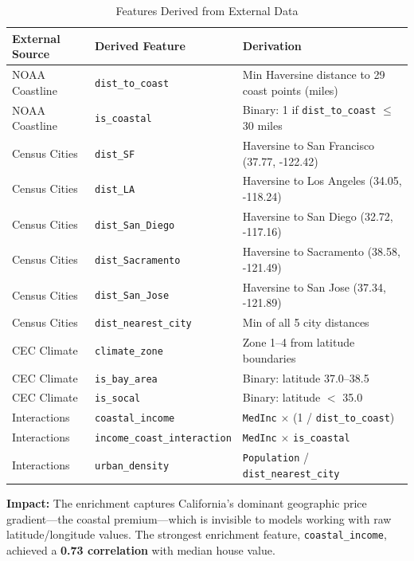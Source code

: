 \documentclass[12pt,a4paper]{article}
\begin{document}
\begin{table}[H]
\centering
\caption{Features Derived from External Data}
\footnotesize
\begin{tabular}{llp{8cm}}
\toprule
\textbf{External Source} & \textbf{Derived Feature} & \textbf{Derivation} \\
\midrule
NOAA Coastline & \texttt{dist\_to\_coast} & Min Haversine distance to 29 coast points (miles) \\
NOAA Coastline & \texttt{is\_coastal} & Binary: 1 if \texttt{dist\_to\_coast} $\leq$ 30 miles \\
\addlinespace
Census Cities & \texttt{dist\_SF} & Haversine to San Francisco (37.77, -122.42) \\
Census Cities & \texttt{dist\_LA} & Haversine to Los Angeles (34.05, -118.24) \\
Census Cities & \texttt{dist\_San\_Diego} & Haversine to San Diego (32.72, -117.16) \\
Census Cities & \texttt{dist\_Sacramento} & Haversine to Sacramento (38.58, -121.49) \\
Census Cities & \texttt{dist\_San\_Jose} & Haversine to San Jose (37.34, -121.89) \\
Census Cities & \texttt{dist\_nearest\_city} & Min of all 5 city distances \\
\addlinespace
CEC Climate & \texttt{climate\_zone} & Zone 1--4 from latitude boundaries \\
CEC Climate & \texttt{is\_bay\_area} & Binary: latitude 37.0--38.5 \\
CEC Climate & \texttt{is\_socal} & Binary: latitude $<$ 35.0 \\
\addlinespace
Interactions & \texttt{coastal\_income} & \texttt{MedInc} $\times$ (1 / \texttt{dist\_to\_coast}) \\
Interactions & \texttt{income\_coast\_interaction} & \texttt{MedInc} $\times$ \texttt{is\_coastal} \\
Interactions & \texttt{urban\_density} & \texttt{Population} / \texttt{dist\_nearest\_city} \\
\bottomrule
\end{tabular}
\end{table}

\textbf{Impact:} The enrichment captures California's dominant geographic price gradient---the coastal premium---which is invisible to models working with raw latitude/longitude values. The strongest enrichment feature, \texttt{coastal\_income}, achieved a \textbf{0.73 correlation} with median house value.
\end{document}
